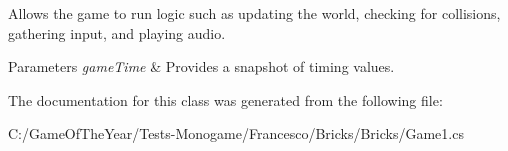 Allows the game to run logic such as updating the world, checking for collisions, gathering input, and playing audio. 


\begin{DoxyParams}{Parameters}
{\em game\+Time} & Provides a snapshot of timing values.\\
\hline
\end{DoxyParams}


The documentation for this class was generated from the following file\+:\begin{DoxyCompactItemize}
\item 
C\+:/\+Game\+Of\+The\+Year/\+Tests-\/\+Monogame/\+Francesco/\+Bricks/\+Bricks/Game1.\+cs\end{DoxyCompactItemize}
